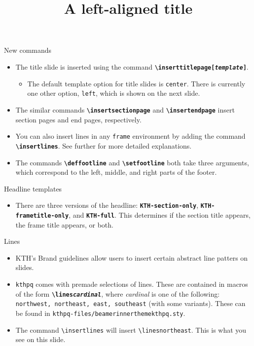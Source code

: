 \documentclass[17pt, t, lualatex]{beamer}
\renewcommand*{\emph}[1]{{\color{digital blue} \bfseries #1}}
\def\kthpq{\texttt{kthpq}}
\begin{document}
\begin{frame}{New commands}
\begin{itemize}
\item The title slide is inserted using the command \emph{\texttt{\textbackslash inserttitlepage[\textnormal{\textit{template}}]}}.
\begin{itemize}
\item The default template option for title slides is \texttt{center}. There is currently one other option, \texttt{left}, which is shown on the next slide.
\end{itemize}
\item The similar commands \emph{\texttt{\textbackslash insertsectionpage}} and \emph{\texttt{\textbackslash insertendpage}} insert section pages and end pages, respectively.
\item You can also insert lines in any \texttt{frame} environment by adding the command \emph{\texttt{\textbackslash insertlines}}. See further for more detailed explanations.
\item The commands \emph{\texttt{\textbackslash deffootline}} and \emph{\texttt{\textbackslash setfootline}} both take three arguments, which correspond to the left, middle, and right parts of the footer.
\end{itemize}
\end{frame}

\title{A left-aligned title}

\inserttitlepage[left]

\begin{frame}{Headline templates}
\begin{itemize}
\item There are three versions of the headline: \emph{\texttt{KTH-section-only}}, \emph{\texttt{KTH-frametitle-only}}, and \emph{\texttt{KTH-full}}. This determines if the section title appears, the frame title appears, or both.
\end{itemize}
\end{frame}

\begin{frame}{Lines}
\insertlines
\begin{minipage}{.65\paperwidth}
\begin{itemize}
\item KTH's Brand guidelines allow users to insert certain abstract line patters on slides.
\item \kthpq{} comes with premade selections of lines. These are contained in macros of the form \emph{\texttt{\textbackslash lines\textnormal{\textit{cardinal}}}}, where \textit{cardinal} is one of the following: \texttt{northwest, northeast, east, southeast} (with some variants). These can be found in \texttt{kthpq-files/beamerinnerthemekthpq.sty}.
\item The command \texttt{\textbackslash insertlines} will insert \texttt{\textbackslash linesnortheast}. This is what you see on this slide.
\end{itemize}
\end{minipage}
\end{frame}
\end{document}
